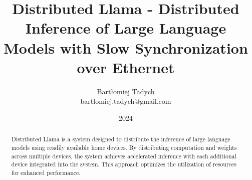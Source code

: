 \documentclass{article}
\begin{document}
\title{Distributed Llama - Distributed Inference of Large Language Models with Slow Synchronization over Ethernet}
\date{2024}
\author{Bartłomiej Tadych\\\small{bartlomiej.tadych@gmail.com}}

\maketitle

\begin{abstract}

Distributed Llama is a system designed to distribute the inference of large language models using readily available home devices. By distributing computation and weights across multiple devices, the system achieves accelerated inference with each additional device integrated into the system. This approach optimizes the utilization of resources for enhanced performance.

\end{abstract}
\end{document}
